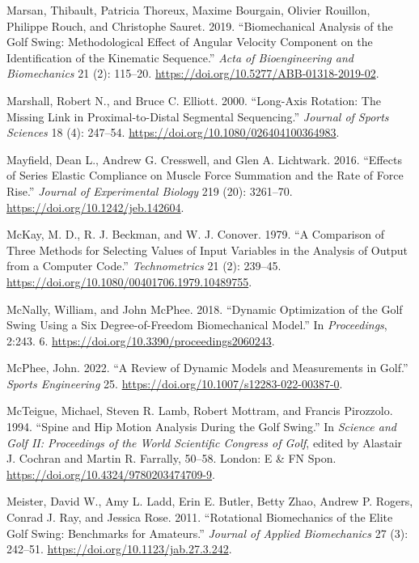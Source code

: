 \documentclass[
  letterpaper,
]{report}
\newlength{\cslhangindent}
\newenvironment{CSLReferences}[2] %
 {\begin{list}{}{%
  \setlength{\itemindent}{0pt}
  \setlength{\leftmargin}{0pt}
  \setlength{\parsep}{0pt}
  \ifodd #1
   \setlength{\leftmargin}{\cslhangindent}
   \setlength{\itemindent}{-1\cslhangindent}
  \fi
  \setlength{\itemsep}{#2\baselineskip}}}
 {\end{list}}
\begin{document}
\begin{CSLReferences}{1}{0}
Marsan, Thibault, Patricia Thoreux, Maxime Bourgain, Olivier Rouillon,
Philippe Rouch, and Christophe Sauret. 2019. {``Biomechanical Analysis
of the Golf Swing: Methodological Effect of Angular Velocity Component
on the Identification of the Kinematic Sequence.''} \emph{Acta of
Bioengineering and Biomechanics} 21 (2): 115--20.
\url{https://doi.org/10.5277/ABB-01318-2019-02}.

Marshall, Robert N., and Bruce C. Elliott. 2000. {``Long-Axis Rotation:
The Missing Link in Proximal-to-Distal Segmental Sequencing.''}
\emph{Journal of Sports Sciences} 18 (4): 247--54.
\url{https://doi.org/10.1080/026404100364983}.

Mayfield, Dean L., Andrew G. Cresswell, and Glen A. Lichtwark. 2016.
{``Effects of Series Elastic Compliance on Muscle Force Summation and
the Rate of Force Rise.''} \emph{Journal of Experimental Biology} 219
(20): 3261--70. \url{https://doi.org/10.1242/jeb.142604}.

McKay, M. D., R. J. Beckman, and W. J. Conover. 1979. {``A Comparison of
Three Methods for Selecting Values of Input Variables in the Analysis of
Output from a Computer Code.''} \emph{Technometrics} 21 (2): 239--45.
\url{https://doi.org/10.1080/00401706.1979.10489755}.

McNally, William, and John McPhee. 2018. {``Dynamic Optimization of the
Golf Swing Using a Six Degree-of-Freedom Biomechanical Model.''} In
\emph{Proceedings}, 2:243. 6.
\url{https://doi.org/10.3390/proceedings2060243}.

McPhee, John. 2022. {``A Review of Dynamic Models and Measurements in
Golf.''} \emph{Sports Engineering} 25.
\url{https://doi.org/10.1007/s12283-022-00387-0}.

McTeigue, Michael, Steven R. Lamb, Robert Mottram, and Francis
Pirozzolo. 1994. {``Spine and Hip Motion Analysis During the Golf
Swing.''} In \emph{Science and Golf II: Proceedings of the World
Scientific Congress of Golf}, edited by Alastair J. Cochran and Martin
R. Farrally, 50--58. London: E \& FN Spon.
\url{https://doi.org/10.4324/9780203474709-9}.

Meister, David W., Amy L. Ladd, Erin E. Butler, Betty Zhao, Andrew P.
Rogers, Conrad J. Ray, and Jessica Rose. 2011. {``Rotational
Biomechanics of the Elite Golf Swing: Benchmarks for Amateurs.''}
\emph{Journal of Applied Biomechanics} 27 (3): 242--51.
\url{https://doi.org/10.1123/jab.27.3.242}.


\end{CSLReferences}
\end{document}
